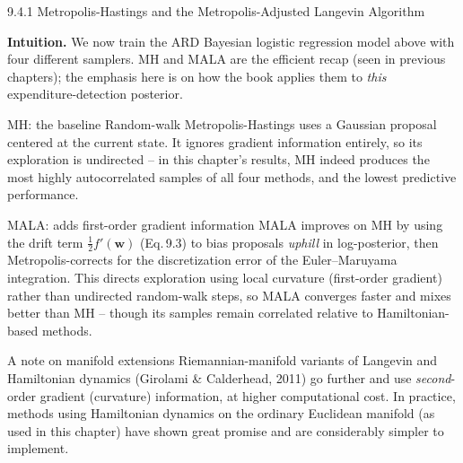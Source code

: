 \documentclass[aspectratio=169,10pt]{beamer}
\newcommand{\vw}{\mathbf{w}}
\begin{document}
\begin{frame}[allowframebreaks]{9.4.1 Metropolis-Hastings and the Metropolis-Adjusted Langevin Algorithm}

\textbf{Intuition.} We now train the ARD Bayesian logistic regression model
above with four different samplers. MH and MALA are the efficient recap
(seen in previous chapters); the emphasis here is on how the book applies
them to \emph{this} expenditure-detection posterior.

\begin{block}{MH: the baseline}
Random-walk Metropolis-Hastings uses a Gaussian proposal centered at the
current state. It ignores gradient information entirely, so its
exploration is undirected -- in this chapter's results, MH indeed produces
the most highly autocorrelated samples of all four methods, and the lowest
predictive performance.
\end{block}

\begin{block}{MALA: adds first-order gradient information}
MALA improves on MH by using the drift term $\tfrac12 f'(\vw)$ (Eq.\,9.3)
to bias proposals \emph{uphill} in log-posterior, then Metropolis-corrects
for the discretization error of the Euler--Maruyama integration. This
directs exploration using local curvature (first-order gradient) rather
than undirected random-walk steps, so MALA converges faster and mixes
better than MH -- though its samples remain correlated relative to
Hamiltonian-based methods.
\end{block}

\framebreak

\begin{block}{A note on manifold extensions}
Riemannian-manifold variants of Langevin and Hamiltonian dynamics (Girolami
\& Calderhead, 2011) go further and use \emph{second}-order gradient
(curvature) information, at higher computational cost. In practice, methods
using Hamiltonian dynamics on the ordinary Euclidean manifold (as used in
this chapter) have shown great promise and are considerably simpler to
implement.
\end{block}

\end{frame}
\end{document}
